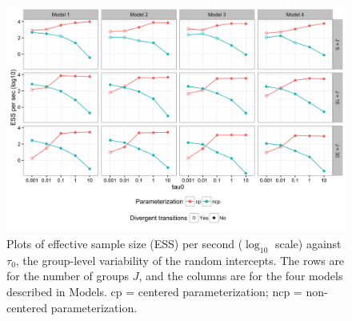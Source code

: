 \documentclass[10pt,a4paper]{article}
\begin{document}
\begin{figure}[h!]
	\begin{center}
		\includegraphics[scale=0.175]{tau0_ess_per_sec.png}
		\caption{Plots of effective sample size (ESS) per second ($\log_{10}$ scale) against $\tau_0$, the group-level variability of the random intercepts. The rows are for the number of groups $J$, and the columns are for the four models described in Models. cp = centered parameterization; ncp = non-centered parameterization.}
		\label{fig:results}
	\end{center}
\end{figure}
\end{document}
